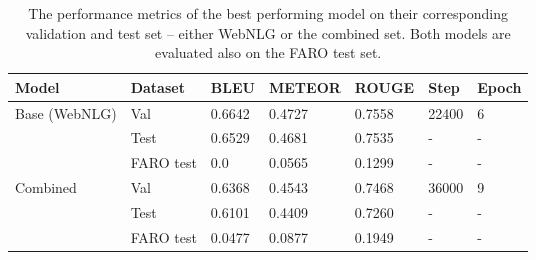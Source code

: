 \documentclass[
]{ceurart}
\begin{document}
\begin{table}[ht]
	\caption{The performance metrics of the best performing model on their corresponding validation and test set -- either WebNLG or the combined set. Both models are evaluated also on the FARO test set.}
	\centering
	\begin{tabular}{|l|l|l|l|l|l|l|}
		\hline
		\textbf{Model}                 & \textbf{Dataset} & \textbf{BLEU} & \textbf{METEOR} & \textbf{ROUGE} & \textbf{Step} & \textbf{Epoch} \\ \hline
		\multirow{3}{*}{Base (WebNLG)} & Val              & 0.6642        & 0.4727          & 0.7558         & 22400         & 6              \\ \cline{2-7}
		                               & Test             & 0.6529        & 0.4681          & 0.7535         & -             & -              \\ \cline{2-7}
		                               & FARO test        & 0.0           & 0.0565          & 0.1299         & -             & -              \\ \hline
		\multirow{3}{*}{Combined}      & Val              & 0.6368        & 0.4543          & 0.7468         & 36000         & 9              \\ \cline{2-7}
		                               & Test             & 0.6101        & 0.4409          & 0.7260         & -             & -              \\ \cline{2-7}
		                               & FARO test        & 0.0477        & 0.0877          & 0.1949         & -             & -              \\ \hline
	\end{tabular}

	\label{tab:training_jointgt}
\end{table}
\end{document}
